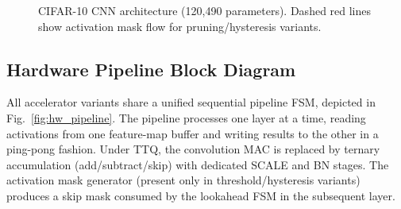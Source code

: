 \documentclass[conference]{IEEEtran}
\begin{document}
\begin{figure}[H]
\caption{CIFAR-10 CNN architecture (120,490 parameters). Dashed red lines show activation mask flow for pruning/hysteresis variants.}
\label{fig:cifar_arch}
\end{figure}

\subsection{Hardware Pipeline Block Diagram}

All accelerator variants share a unified sequential pipeline FSM, depicted in Fig.~\ref{fig:hw_pipeline}. The pipeline processes one layer at a time, reading activations from one feature-map buffer and writing results to the other in a ping-pong fashion. Under TTQ, the convolution MAC is replaced by ternary accumulation (add/subtract/skip) with dedicated SCALE and BN stages. The activation mask generator (present only in threshold/hysteresis variants) produces a skip mask consumed by the lookahead FSM in the subsequent layer.
\end{document}
